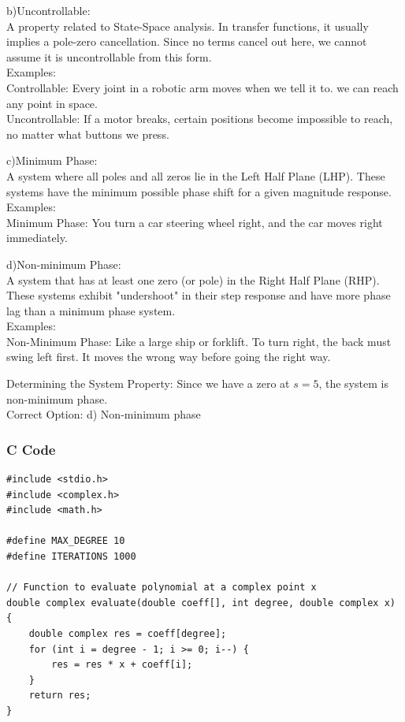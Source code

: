 \documentclass{beamer}
\begin{document}
\begin{frame}{}
b)Uncontrollable:\\
A property related to State-Space analysis. In transfer functions, it usually implies a pole-zero cancellation. Since no terms cancel out here, we cannot assume it is uncontrollable from this form.\\

Examples:\\
Controllable: Every joint in a robotic arm moves when we tell it to. we can reach any point in space.\\

Uncontrollable: If a motor breaks, certain positions become impossible to reach, no matter what buttons we press.\\
\end{frame}
\begin{frame}
c)Minimum Phase:\\
A system where all poles and all zeros lie in the Left Half Plane (LHP). These systems have the minimum possible phase shift for a given magnitude response.\\

Examples:\\
Minimum Phase: You turn a car steering wheel right, and the car moves right immediately.\\
\end{frame}
\begin{frame}
d)Non-minimum Phase:\\
A system that has at least one zero (or pole) in the Right Half Plane (RHP). These systems exhibit "undershoot" in their step response and have more phase lag than a minimum phase system.\\

Examples:\\
Non-Minimum Phase: Like a large ship or forklift. To turn right, the back must swing left first. It moves the wrong way before going the right way.
\end{frame}
\begin{frame}
Determining the System Property:
Since we have a zero at $s = 5$, the system is non-minimum phase.\\
Correct Option: d) Non-minimum phase
\end{frame}

\begin{frame}[fragile]
\frametitle{C Code}
\begin{lstlisting}
#include <stdio.h>
#include <complex.h>
#include <math.h>

#define MAX_DEGREE 10
#define ITERATIONS 1000

// Function to evaluate polynomial at a complex point x
double complex evaluate(double coeff[], int degree, double complex x) {
    double complex res = coeff[degree];
    for (int i = degree - 1; i >= 0; i--) {
        res = res * x + coeff[i];
    }
    return res;
}
\end{lstlisting}
\end{frame}
\end{document}
